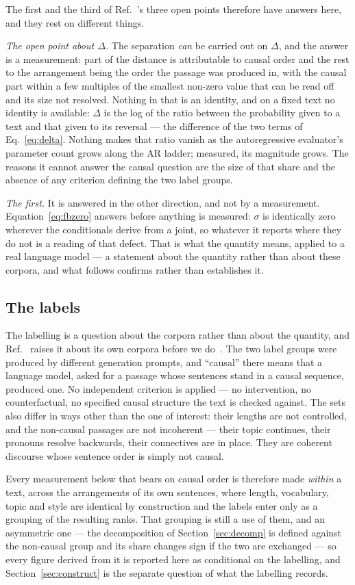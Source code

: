 The first and the third of Ref.~\cite{sagawa2026}'s three open points
therefore have answers here, and they rest on different things.

\emph{The open point about $\Delta$.}  The separation \emph{can} be carried
out on $\Delta$,
and the answer is a measurement: part of the distance is attributable to
causal order and the rest to the arrangement being the order the passage was
produced in, with the causal part within a few multiples of the smallest
non-zero value that can be read off and its size not resolved.  Nothing
in that is an identity, and on a fixed text no identity is available:
$\Delta$ is the log of the ratio between the probability given to a text and
that given to its reversal --- the difference of the two terms of
Eq.~\eqref{eq:delta}.  Nothing makes that ratio vanish as the autoregressive evaluator's parameter
count grows along the AR ladder; measured, its magnitude grows.  The reasons
it cannot answer the causal question are the size of that share and the
absence of any criterion defining the two label groups.

\emph{The first.}  It is answered in the other direction, and not by a
measurement.  Equation~\eqref{eq:fbzero} answers before anything is
measured: $\sigma$ is
identically zero wherever the conditionals derive from a joint, so whatever
it reports where they do not is a reading of that defect.  That is what the
quantity means, applied to a real language model --- a statement about the
quantity rather than about these corpora, and what follows confirms rather
than establishes it.

\subsection*{The labels}

The labelling is a question about the corpora rather than about the
quantity, and Ref.~\cite{sagawa2026} raises it about its own corpora before
we do~\cite[Sec.~V~B]{sagawa2026}.  The two label groups were produced by
different generation prompts, and ``causal'' there means that a
language model, asked for a passage whose sentences stand in a causal
sequence, produced one.  No independent criterion is applied --- no
intervention, no counterfactual, no specified causal structure the text is
checked against.  The sets also differ in ways other than the one of
interest: their lengths are not controlled, and the non-causal passages are not incoherent --- their topic
continues, their pronouns resolve backwards, their connectives are in place.
They are coherent discourse whose sentence order is simply not causal.

Every measurement below that bears on causal order is therefore made
\emph{within} a text, across the arrangements of its own sentences, where
length, vocabulary, topic and style are identical by construction and the
labels enter only as a grouping of the resulting ranks.  That grouping is
still a use of them, and an asymmetric one --- the decomposition of
Section~\ref{sec:decomp} is defined against the non-causal group and its
share changes sign if the two are exchanged --- so every figure derived from it
is reported here as conditional on the labelling, and
Section~\ref{sec:construct} is the separate question of what the labelling
records.
